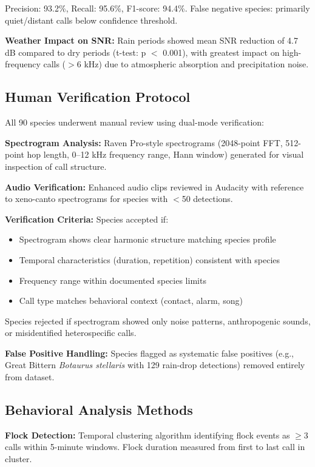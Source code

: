 \documentclass[twocolumn]{article}
\begin{document}
Precision: 93.2\%, Recall: 95.6\%, F1-score: 94.4\%. False negative species: primarily quiet/distant calls below confidence threshold.

\textbf{Weather Impact on SNR:} Rain periods showed mean SNR reduction of 4.7 dB compared to dry periods (t-test: p $<$ 0.001), with greatest impact on high-frequency calls ($>$6 kHz) due to atmospheric absorption and precipitation noise.

\subsection{Human Verification Protocol}

All 90 species underwent manual review using dual-mode verification:

\textbf{Spectrogram Analysis:} Raven Pro-style spectrograms (2048-point FFT, 512-point hop length, 0--12 kHz frequency range, Hann window) generated for visual inspection of call structure.

\textbf{Audio Verification:} Enhanced audio clips reviewed in Audacity with reference to xeno-canto spectrograms for species with $<$50 detections.

\textbf{Verification Criteria:} Species accepted if:
\begin{itemize}
\item Spectrogram shows clear harmonic structure matching species profile
\item Temporal characteristics (duration, repetition) consistent with species
\item Frequency range within documented species limits
\item Call type matches behavioral context (contact, alarm, song)
\end{itemize}

Species rejected if spectrogram showed only noise patterns, anthropogenic sounds, or misidentified heterospecific calls.

\textbf{False Positive Handling:} Species flagged as systematic false positives (e.g., Great Bittern \textit{Botaurus stellaris} with 129 rain-drop detections) removed entirely from dataset.

\subsection{Behavioral Analysis Methods}

\textbf{Flock Detection:} Temporal clustering algorithm identifying flock events as $\geq$3 calls within 5-minute windows. Flock duration measured from first to last call in cluster.
\end{document}
